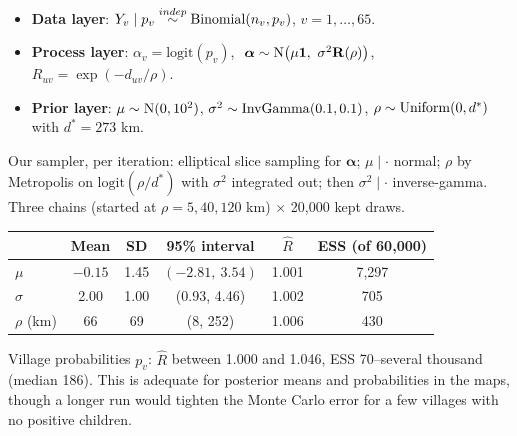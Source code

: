 \documentclass[11pt]{article}
\begin{document}
\solution
{}
\begin{itemize}
\item \textbf{Data layer}: $Y_v\mid p_v\overset{indep}{\sim}\mathrm{Binomial}(n_v,p_v)$, $v=1,\dots,65$.
\item \textbf{Process layer}: $\alpha_v=\mathrm{logit}(p_v)$, $\ \bm\alpha\sim\dist N\big(\mu\mathbf 1,\ \sigma^2\mathbf R(\rho)\big)$, $R_{uv}=\exp(-d_{uv}/\rho)$.
\item \textbf{Prior layer}: $\mu\sim\mathrm{N}(0,10^2)$, $\sigma^2\sim\mathrm{InvGamma}(0.1,0.1)$, $\rho\sim\mathrm{Uniform}(0,d^*)$ with $d^*=273$ km.
\end{itemize}
 Our sampler, per iteration: elliptical slice sampling for $\bm\alpha$; $\mu\mid\cdot$ normal; $\rho$ by Metropolis on $\mathrm{logit}(\rho/d^*)$ with $\sigma^2$ integrated out; then $\sigma^2\mid\cdot$ inverse-gamma. Three chains (started at $\rho=5,40,120$ km) $\times$ 20{,}000 kept draws.
\begin{center}
\begin{tabular}{lccccc}\toprule
 & Mean & SD & 95\% interval & $\hat R$ & ESS (of 60{,}000)\\\midrule
$\mu$ & $-0.15$ & 1.45 & $(-2.81,\ 3.54)$ & 1.001 & 7{,}297\\
$\sigma$ & 2.00 & 1.00 & (0.93, 4.46) & 1.002 & 705\\
$\rho$ (km) & 66 & 69 & (8, 252) & 1.006 & 430\\\bottomrule
\end{tabular}
\end{center}
Village probabilities $p_v$: $\hat R$ between 1.000 and 1.046, ESS 70--several thousand (median 186). This is adequate for posterior means and probabilities in the maps, though a longer run would tighten the Monte Carlo error for a few villages with no positive children.
\JAGSsevenSix
\end{document}
